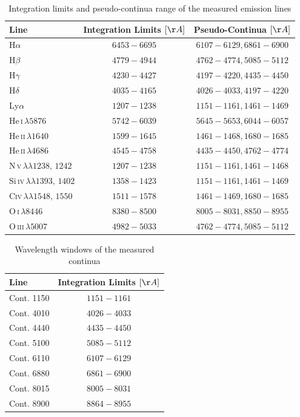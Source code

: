 \begin{table}[htbp]
	\centering
	\small
	\caption{Integration limits and pseudo-continua range of the measured emission lines}
	\label{tab:emission_lines}
	\begin{tabular}{lcc}
		\hline
		\hline
		\textbf{Line} & \textbf{Integration Limits $[\AA]$} & \textbf{Pseudo-Continua $[\AA]$}  \\
		\hline
		\hline
		
		
		H$\alpha$ & $6453-6695$ & $6107-6129, 6861-6900$ \\
		H$\beta$ & $4779-4944$ & $4762-4774, 5085-5112$ \\
		H$\gamma$ & $4230-4427$ & $4197-4220, 4435-4450$ \\
		H$\delta$ & $4035-4165 $ & $4026-4033, 4197-4220 $ \\
		Ly$\alpha$ & $1207-1238$ & $1151-1161, 1461-1469$\\
		\hline
		He\,\textsc{i}$\,\lambda5876$ & $5742-6039$ & $5645-5653, 6044-6057$ \\
		He\,\textsc{ii}$\,\lambda1640$ & $1599-1645$ & $1461-1468, 1680-1685$\\
		He\,\textsc{ii}$\,\lambda4686$ & $4545-4758$ & $4435-4450, 4762-4774$ \\
		\hline
		N\,\textsc{v}$\,\lambda\lambda 1238,\,1242$ & $1207-1238$ & $1151-1161, 1461-1468$\\
		Si\,\textsc{iv}$\,\lambda\lambda 1393,\,1402$ & $1358-1423$ & $1151-1161, 1461-1469$\\
		C\textsc{iv}$\,\lambda\lambda 1548,\,1550$ & $1511-1578$ & $1461-1469, 1680-1685$\\
		\hline
		O\,\textsc{i}$\,\lambda 8446$ & $8380-8500$ & $8005-8031, 8850-8955$ \\
		O\,\textsc{iii}$\,\lambda 5007$ & $4982-5033$ & $4762-4774, 5085-5112$ \\
		\hline
		\hline
	\end{tabular}
\end{table}


\begin{table}[htbp]
	\centering
	\small
	\caption{Wavelength windows of the measured continua}
	\label{tab:continua}
	\begin{tabular}{lc}
		\hline
		\hline
		\textbf{Line} & \textbf{Integration Limits $[\AA]$}  \\
		\hline
		\hline
		Cont. 1150 & $1151-1161$\\
		\hline
		Cont. 4010 & $4026-4033$\\
		Cont. 4440 & $4435-4450$\\
		Cont. 5100 & $5085-5112$\\
		Cont. 6110 & $6107-6129$\\
		Cont. 6880 & $6861-6900$\\
		Cont. 8015 & $8005-8031$\\
		Cont. 8900 & $8864-8955$\\
		\hline
		\hline
	\end{tabular}
\end{table}

